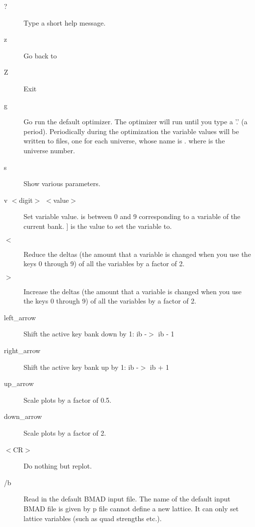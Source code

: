 \begin{description}
\item[?]
Type a short help message.

\item[z] 
Go back to 

\item[Z] 
Exit \tao
                                        
\item[g]
Go run the default optimizer. The optimizer will run until you type a 
'.' (a period).
Periodically during the optimization the variable values
will be written to files, one for each universe, whose name is 
. where \vn{\#} is the universe number.

\item[s]  
Show various parameters.

\item[v $<$digit$>$ $<$value$>$]
Set variable value.  is between 0 and 9 corresponding
to a variable of the current bank. ] is the value to set the
variable to.

\item[$<$]
Reduce the deltas (the amount that a variable is changed when you use the
keys 0 through 9) of all the variables by a factor of 2.

\item[$>$]
Increase the deltas (the amount that a variable is changed when you use
the keys 0 through 9) of all the variables by a factor of 2.

\item[left\_arrow]
Shift the active key bank down by 1: ib -$>$ ib - 1

\item[right\_arrow]
Shift the active key bank up by 1: ib -$>$ ib + 1

\item[up\_arrow]
Scale plots by a factor of 0.5.

\item[down\_arrow]
Scale plots by a factor of 2.

\item[$<$CR$>$]
Do nothing but replot.

\item[/b] 
Read in the default BMAD input file.
The name of the default input BMAD file is given by p%
file cannot define a new lattice. It can only set lattice variables (such as
quad strengths etc.).


\end{description}
